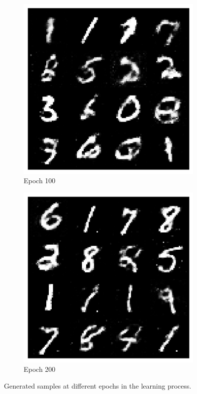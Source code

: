 \documentclass[11pt,a4paper]{article}
\begin{document}
\begin{figure}[ht]
    \vspace{1em}

    \begin{subfigure}[b]{0.48\textwidth}
        \includegraphics[width=\linewidth]{./images/epoch_100.png}
        \caption{Epoch 100}
        \label{fig:img3}
    \end{subfigure}
    \hfill
    \begin{subfigure}[b]{0.48\textwidth}
        \includegraphics[width=\linewidth]{./images/epoch_200.png}
        \caption{Epoch 200}
        \label{fig:img4}
    \end{subfigure}

    \caption{Generated samples at different epochs in the learning process.}
    \label{fig:2x2grid}
\end{figure}



\end{document}
